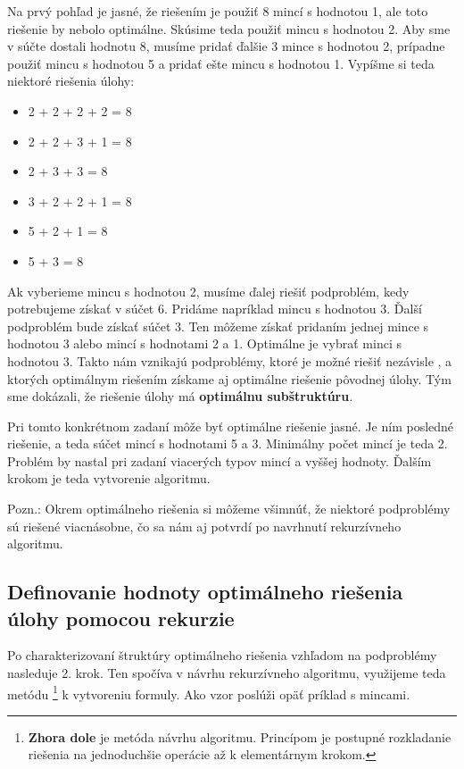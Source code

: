 Na prvý pohľad je jasné, že riešením je použiť 8 mincí s hodnotou 1, ale toto riešenie by nebolo optimálne. Skúsime teda použiť mincu s hodnotou 2. Aby sme v súčte dostali hodnotu 8, musíme pridať ďalšie 3 mince s hodnotou 2, prípadne použiť mincu s hodnotou 5 a pridať ešte mincu s hodnotou 1. Vypíšme si teda niektoré riešenia úlohy:

\begin{itemize}
    \item 2 + 2 + 2 + 2 = 8
    \item 2 + 2 + 3 + 1 = 8
    \item 2 + 3 + 3 = 8
    \item 3 + 2 + 2 + 1 = 8
    \item 5 + 2 + 1 = 8
    \item 5 + 3 = 8
\end{itemize}

Ak vyberieme mincu s hodnotou 2, musíme ďalej riešiť podproblém, kedy potrebujeme získať v súčet 6. Pridáme napríklad mincu s hodnotou 3. Ďalší podproblém bude získať súčet 3. Ten môžeme získať pridaním jednej mince s hodnotou 3 alebo mincí s hodnotami 2 a 1. Optimálne je vybrať minci s hodnotou 3. Takto nám vznikajú podproblémy, ktoré je možné riešiť nezávisle , a ktorých optimálnym riešením získame aj optimálne riešenie pôvodnej úlohy. Tým sme dokázali, že riešenie úlohy má \textbf{optimálnu subštruktúru}.

Pri tomto konkrétnom zadaní môže byť optimálne riešenie jasné. Je ním posledné riešenie, a teda súčet mincí s hodnotami 5 a 3. Minimálny počet mincí je teda 2. Problém by nastal pri zadaní viacerých typov mincí a vyššej hodnoty. Ďalším krokom je teda vytvorenie algoritmu. 

Pozn.: Okrem optimálneho riešenia si môžeme všimnúť, že niektoré podproblémy sú riešené viacnásobne, čo sa nám aj potvrdí po navrhnutí rekurzívneho algoritmu.

\subsection{Definovanie hodnoty optimálneho riešenia úlohy pomocou rekurzie} \label{defOptRies}

Po charakterizovaní štruktúry optimálneho riešenia vzhľadom na podproblémy nasleduje 2. krok. Ten spočíva v návrhu rekurzívneho algoritmu, využijeme teda metódu  \footnote{\textbf{Zhora dole} je metóda návrhu algoritmu. Princípom je postupné rozkladanie riešenia na jednoduchšie operácie až k elementárnym krokom.} k vytvoreniu formuly. Ako vzor poslúži opäť príklad s mincami. 

